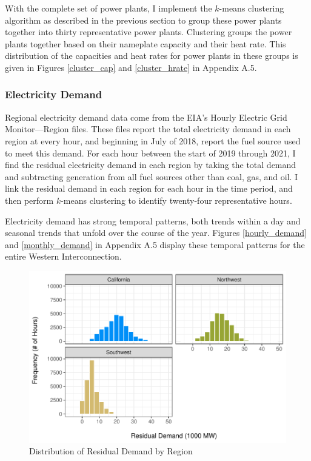 With the complete set of power plants, I implement the $k$-means clustering algorithm as described in the previous section to group these power plants together into thirty representative power plants. Clustering groups the power plants together based on their nameplate capacity and their heat rate. This distribution of the capacities and heat rates for power plants in these groups is given in Figures \ref{cluster_cap} and \ref{cluster_hrate} in Appendix A.5. 

\subsubsection*{Electricity Demand}

Regional electricity demand data come from the EIA's Hourly Electric Grid Monitor---Region files. These files report the total electricity demand in each region at every hour, and beginning in July of 2018, report the fuel source used to meet this demand. For each hour between the start of 2019 through 2021, I find the residual electricity demand in each region by taking the total demand and subtracting generation from all fuel sources other than coal, gas, and oil. I link the residual demand in each region for each hour in the time period, and then perform $k$-means clustering to identify twenty-four representative hours. 

Electricity demand has strong temporal patterns, both trends within a day and seasonal trends that unfold over the course of the year. Figures \ref{hourly_demand} and \ref{monthly_demand} in Appendix A.5 display these temporal patterns for the entire Western Interconnection. 

\begin{figure}
    \centering
    \caption{Distribution of Residual Demand by Region\label{dist_rdemand}}
    \includegraphics[width=\textwidth]{figures/chapter5_figures/residual_demand_region.pdf}
\end{figure}

